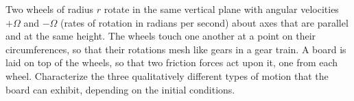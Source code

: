 Two wheels of radius $r$ rotate in the same vertical plane with
angular velocities $+\Omega$ and $-\Omega$ (rates of rotation in radians per second) about axes that are
parallel and at the same height. The wheels touch one another at a point on
their circumferences, so that their rotations mesh like gears in a gear train.
A board is laid on top of the wheels, so that two friction forces act upon it,
one from each wheel. Characterize the three  qualitatively different types
of motion that the board can exhibit, depending on the initial conditions.
